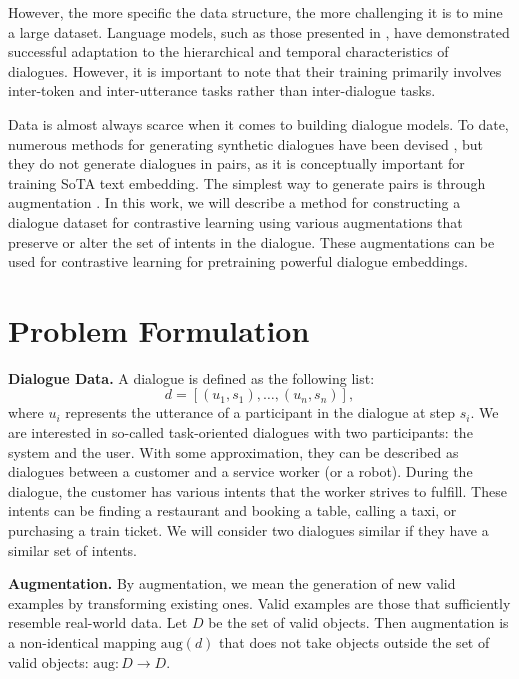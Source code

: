\documentclass{article}
\begin{document}
However, the more specific the data structure, the more challenging it is to mine a large dataset. Language models, such as those presented in \cite{zhang-etal-2023-dialog, li2022future}, have demonstrated successful adaptation to the hierarchical and temporal characteristics of dialogues. However, it is important to note that their training primarily involves inter-token and inter-utterance tasks rather than inter-dialogue tasks.

Data is almost always scarce when it comes to building dialogue models. To date, numerous methods for generating synthetic dialogues have been devised \cite{kim2021neuralwoz, mohapatra2021simulated, wan-etal-2022-unified, zheng2023augesc, schick2021generating}, but they do not generate dialogues in pairs, as it is conceptually important for training SoTA text embedding. The simplest way to generate pairs is through augmentation \cite{soudani2023data}. In this work, we will describe a method for constructing a dialogue dataset for contrastive learning using various augmentations that preserve or alter the set of intents in the dialogue. These augmentations can be used for contrastive learning for pretraining powerful dialogue embeddings.

\section{Problem Formulation}

\textbf{Dialogue Data.} A dialogue is defined as the following list:
$$
d=[(u_1, s_1), \ldots, (u_n, s_n)],
$$
where $u_i$ represents the utterance of a participant in the dialogue at step $s_i$. We are interested in so-called task-oriented dialogues with two participants: the system and the user. With some approximation, they can be described as dialogues between a customer and a service worker (or a robot). During the dialogue, the customer has various intents that the worker strives to fulfill. These intents can be finding a restaurant and booking a table, calling a taxi, or purchasing a train ticket. We will consider two dialogues similar if they have a similar set of intents.

\textbf{Augmentation.} By augmentation, we mean the generation of new valid examples by transforming existing ones. Valid examples are those that sufficiently resemble real-world data. Let $D$ be the set of valid objects. Then augmentation is a non-identical mapping $\text{aug}(d)$ that does not take objects outside the set of valid objects: $\text{aug}: D\to D.$
\end{document}
